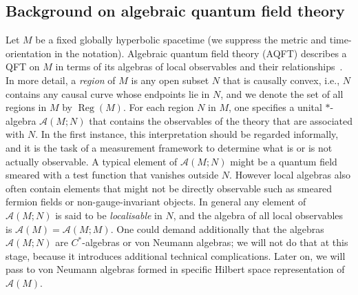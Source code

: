 \documentclass[sn-mathphys-num]{sn-jnl}%
\newcommand{\Af}{\mathscr{A}}
\DeclareMathOperator{\Reg}{Reg}
\numberwithin{equation}{section}
\theoremstyle{thmstyleone}%
\theoremstyle{thmstyletwo}%
\theoremstyle{thmstylethree}%
\begin{document}
\subsection{Background on algebraic quantum field theory}\label{sec:AQFTbackground}

Let $M$ be a fixed globally hyperbolic spacetime (we suppress the metric and time-orientation in the notation). Algebraic quantum field theory (AQFT) describes a QFT on $M$ in terms of its algebras of local observables and their relationships~\cite{Haag:book,AdvAQFT}. In more detail, a \emph{region} of $M$ is any open subset $N$ that is causally convex, i.e., $N$ contains any causal curve whose endpoints lie in $N$, and we denote the set of all regions in $M$ by $\Reg(M)$. For each region $N$ in $M$, one specifies a unital $*$-algebra $\Af(M;N)$ that contains the observables of the theory that are associated with $N$. In the first instance, this interpretation should be regarded informally, and it is the task of a measurement framework to determine what is or is not actually observable.
A typical element of $\Af(M;N)$ might be a quantum field smeared with a test function that vanishes outside $N$. However local algebras also often contain elements that might not be directly observable such as smeared fermion fields or non-gauge-invariant objects. In general any element of $\Af(M;N)$ is said to be \emph{localisable} in $N$, and the algebra of all local observables is $\Af(M)=\Af(M;M)$. One could demand additionally that the algebras $\Af(M;N)$ are $C^*$-algebras or von Neumann algebras; we will not do that at this stage, because it introduces additional technical complications. Later on, we will pass to von Neumann algebras formed in specific Hilbert space representation of $\Af(M)$.  
\end{document}
